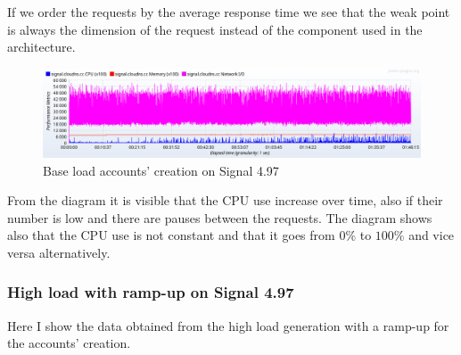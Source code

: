 If we order the requests by the average response time we see that the weak point is always the dimension of the request instead of the component used in the architecture.

\begin{figure}[H]
    \centering
    \includegraphics[width=\textwidth]{images/497/signal-base-create-load}
    \caption{Base load accounts' creation on Signal 4.97}
    \label{fig:signalbasecreateloadold}
\end{figure}

From the diagram it is visible that the CPU use increase over time, also if their number is low and there are pauses between the requests.
The diagram shows also that the CPU use is not constant and that it goes from $0$\% to $100$\% and vice versa alternatively.

\subsubsection{High load with ramp-up on Signal 4.97}

Here I show the data obtained from the high load generation with a ramp-up for the accounts' creation.


